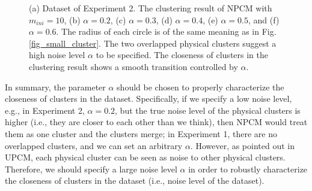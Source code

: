 \documentclass[conference]{IEEEtran}
\theoremstyle{definition}
\begin{document}
\begin{figure}[tb]
\caption{(a) Dataset of Experiment 2. The clustering result of NPCM with $m_{ini}=10$, (b) $\alpha=0.2$, (c) $\alpha=0.3$, (d) $\alpha=0.4$, (e) $\alpha=0.5$, and (f) $\alpha=0.6$.
The radius of each circle is of the same meaning as in Fig.\ref{fig_small_cluster}. The two overlapped physical clusters suggest a high noise level $\alpha$ to be specified. The closeness of clusters in the clustering result shows a smooth transition controlled by $\alpha$.}
\label{fig_close_cluster}
\end{figure}

In summary, the parameter $\alpha$ should be chosen to properly characterize the closeness of clusters in the dataset. Specifically, if we specify a low noise level, e.g., in Experiment 2, $\alpha=0.2$, but the true noise level of the physical clusters is higher (i.e., they are closer to each other than we think), then NPCM would treat them as one cluster and the clusters merge; in Experiment 1, there are no overlapped clusters, and we can set an arbitrary $\alpha$.
However, as pointed out in UPCM, each physical cluster can be seen as noise to other physical clusters. Therefore, we should specify a large noise level $\alpha$ in order to robustly characterize the closeness of clusters in the dataset (i.e., noise level of the dataset).
\end{document}
